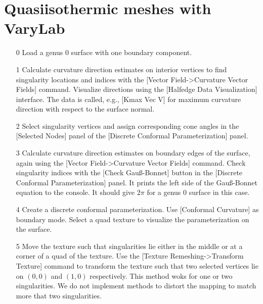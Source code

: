 \documentclass[Thesis.tex]{subfiles}
\begin{document}
\section{Quasiisothermic meshes with {\sc VaryLab}}
\begin{itemize}
\item[0] Load a genus $0$ surface with one boundary component.
\item[1] Calculate curvature direction estimates on interior vertices to find singularity locations and indices with the [Vector Field->Curvature Vector Fields] command. Visualize directions using the [Halfedge Data Visualization] interface. The data is called, e.g., [Kmax Vec V] for maximum curvature direction with respect to the surface normal.
\item[2] Select singularity vertices and assign corresponding cone angles in the [Selected Nodes] panel of the [Discrete Conformal Parameterization] panel.
\item[3] Calculate curvature direction estimates on boundary edges of the surface, again using the [Vector Field->Curvature Vector Fields] command. Check singularity indices with the [Check Gau{\ss}-Bonnet] button in the [Discrete Conformal Parameterization] panel. It prints the left side of the Gau{\ss}-Bonnet equation to the console. It should give $2\pi$ for a genus $0$ surface in this case.\\
\item[4] Create a discrete conformal parameterization. Use [Conformal Curvature] as boundary mode. Select a quad texture to visualize the parameterization on the surface.
\item[5] Move the texture such that singularities lie either in the middle or at a corner of a quad of the texture. Use the [Texture Remeshing->Transform Texture] command to transform the texture such that two selected vertices lie on $(0,0)$ and $(1,0)$ respectively. This method woks for one or two singularities. We do not implement methods to distort the mapping to match more that two singularities.
\end{itemize}
\end{document}
